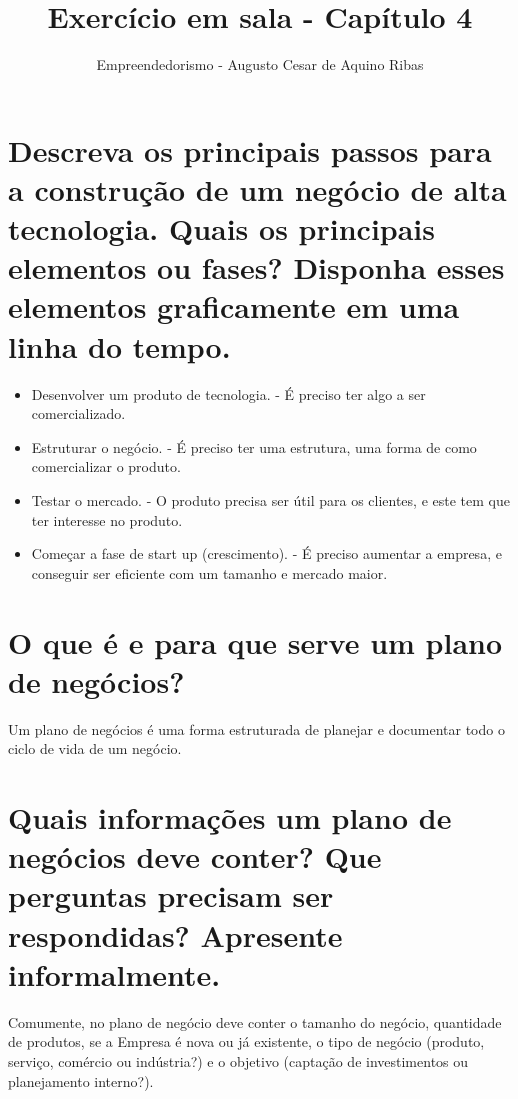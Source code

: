 \documentclass[a4paper,10pt]{article}
\author{Empreendedorismo - Augusto Cesar de Aquino Ribas}
\title{Exercício em sala - Capítulo 4}
\begin{document}
\maketitle

\section{Descreva os principais passos para a construção de um negócio de alta tecnologia. Quais os principais elementos ou fases? Disponha esses elementos graficamente em uma linha do tempo.}


\begin{itemize}
\item Desenvolver um produto de tecnologia. - É preciso ter algo a ser comercializado.
\item Estruturar o negócio. - É preciso ter uma estrutura, uma forma de como comercializar o produto.
\item Testar o mercado.  - O produto precisa ser útil para os clientes, e este tem que ter interesse no produto.
\item Começar a fase de start up (crescimento). - É preciso aumentar a empresa, e conseguir ser eficiente com um tamanho e mercado maior.
\end{itemize}


\section{O que é e para que serve um plano de negócios?}

Um plano de negócios é uma forma estruturada de planejar e documentar todo o ciclo de vida de um negócio.

\section{Quais informações um plano de negócios deve conter? Que perguntas precisam ser respondidas? Apresente informalmente.}

Comumente, no plano de negócio deve conter o tamanho do negócio, quantidade de produtos,
se a Empresa é nova ou já existente, o tipo de negócio (produto, serviço, comércio ou indústria?) e o objetivo (captação de investimentos ou planejamento interno?).
\end{document}
